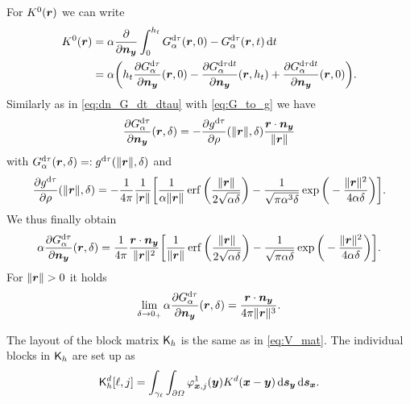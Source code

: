 \documentclass[a4paper,11pt]{article}
\begin{document}
For $K^0({{\bm{r}}})$ we can write
\begin{align*}
  K^0({{\bm{r}}}) &= \alpha\frac{\partial}{\partial {\ensuremath{{\bm{n}}}}_{{\bm{y}}}} \int_{0}^{h_t} G^{{\mathrm{d}} \tau}_\alpha({{\bm{r}}},0) - G^{{\mathrm{d}} \tau}_\alpha({{\bm{r}}}, t) \,{\mathrm{d}} t  \\
  &= \alpha \bigg( h_t\frac{\partial G^{{\mathrm{d}}\tau}_\alpha}{\partial {\ensuremath{{\bm{n}}}}_{{\bm{y}}}} ({{\bm{r}}},0) - \frac{\partial G^{{\mathrm{d}}\tau{\mathrm{d}} t}_\alpha}{\partial {\ensuremath{{\bm{n}}}}_{{\bm{y}}}}({{\bm{r}}},h_t) + \frac{\partial G^{{\mathrm{d}}\tau{\mathrm{d}} t}_\alpha}{\partial {\ensuremath{{\bm{n}}}}_{{\bm{y}}}}({{\bm{r}}},0) \bigg).
\end{align*}
Similarly as in \eqref{eq:dn_G_dt_dtau} with \eqref{eq:G_to_g} we have
\begin{equation*}
  \frac{\partial G^{{\mathrm{d}}\tau}_\alpha}{\partial {\ensuremath{{\bm{n}}}}_{{\bm{y}}}}({{\bm{r}}},\delta) = -\frac{\partial g^{{\mathrm{d}}\tau}}{\partial \rho}(\|{{\bm{r}}}\|,\delta) \frac{{{\bm{r}}} \cdot {\ensuremath{{\bm{n}}}}_{{\bm{y}}}}{\|{{\bm{r}}}\|}
\end{equation*}
with $G^{{\mathrm{d}}\tau}_\alpha({{\bm{r}}},\delta) =: g^{{\mathrm{d}}\tau}(\|{{\bm{r}}}\|,\delta)$ and 
\begin{equation*}
  \frac{\partial g^{{\mathrm{d}}\tau}}{\partial \rho}(\|{{\bm{r}}}\|,\delta) = -\frac{1}{4\pi} \frac{1}{|{{\bm{r}}}\|}\bigg[ \frac{1}{\alpha\|{{\bm{r}}}\|} \operatorname{erf}\bigg( \frac{\|{{\bm{r}}}\|}{2\sqrt{\alpha\delta}} \bigg) - \frac{1}{\sqrt{\pi\alpha^3\delta}} \exp\bigg( -\frac{\|{{\bm{r}}}\|^2}{4\alpha\delta} \bigg) \bigg].
\end{equation*}
We thus finally obtain
\begin{equation}
\label{eq:dn_G_dtau}
  \alpha \frac{\partial G^{{\mathrm{d}}\tau}_\alpha}{\partial {\ensuremath{{\bm{n}}}}_{{\bm{y}}}}({{\bm{r}}},\delta) = \frac{1}{4\pi} \frac{{{\bm{r}}} \cdot {\ensuremath{{\bm{n}}}}_{{\bm{y}}}}{\|{{\bm{r}}}\|^2}\bigg[ \frac{1}{\|{{\bm{r}}}\|} \operatorname{erf}\bigg( \frac{\|{{\bm{r}}}\|}{2\sqrt{\alpha\delta}} \bigg) - \frac{1}{\sqrt{\pi\alpha\delta}} \exp\bigg( -\frac{\|{{\bm{r}}}\|^2}{4\alpha\delta} \bigg) \bigg].
\end{equation}
For $\|{{\bm{r}}}\| > 0$ it holds
\begin{equation}
\label{eq:dn_G_dtau_lim_r}
  \lim_{\delta \to 0_+} \alpha\frac{\partial G^{{\mathrm{d}}\tau}_\alpha}{\partial {\ensuremath{{\bm{n}}}}_{{\bm{y}}}}({{\bm{r}}},\delta) = \frac{ {{\bm{r}}} \cdot {\ensuremath{{\bm{n}}}}_{{\bm{y}}}}{4\pi\|{{\bm{r}}}\|^3}.
\end{equation}

The layout of the block matrix ${{\mathsf{K}}}_h$ is the same as in \eqref{eq:V_mat}. The individual blocks in ${{\mathsf{K}}}_h$ are set up as
\begin{equation*}
  {\ensuremath{{\mathsf{K}}}}^d_h[ \ell , j ] = \int_{\gamma_\ell} \int_{\partial\Omega} \varphi^1_{{{\bm{x}}},j}({{\bm{y}}}) K^d({{\bm{x}}}-{{\bm{y}}}) \,{\mathrm{d}}{{\bm{s}}}_{{\bm{y}}} \,{\mathrm{d}}{{\bm{s}}}_{{\bm{x}}}.
\end{equation*}
\end{document}
